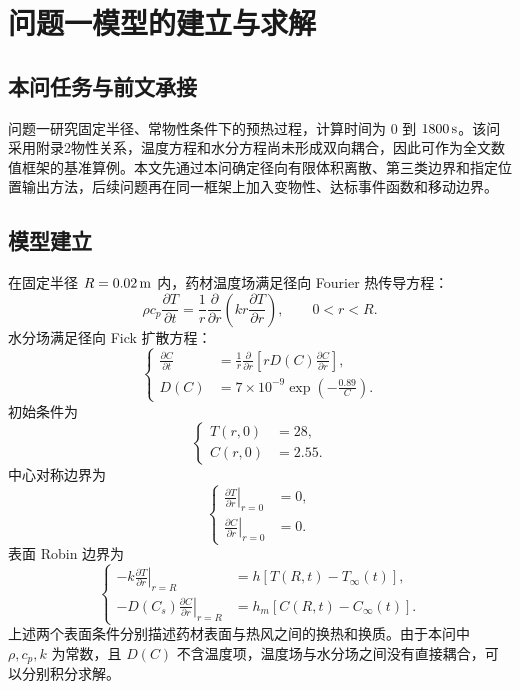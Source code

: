 \documentclass[UTF8,a4paper,12pt]{ctexart}
\begin{document}
\section{问题一模型的建立与求解}
\subsection{本问任务与前文承接}
问题一研究固定半径、常物性条件下的预热过程，计算时间为 $0$ 到 $1800\rm\,s$。该问采用附录2物性关系，温度方程和水分方程尚未形成双向耦合，因此可作为全文数值框架的基准算例。本文先通过本问确定径向有限体积离散、第三类边界和指定位置输出方法，后续问题再在同一框架上加入变物性、达标事件函数和移动边界。

\subsection{模型建立}
在固定半径 $R=0.02\rm\,m$ 内，药材温度场满足径向 Fourier 热传导方程：
\begin{equation}
  \rho c_p\frac{\partial T}{\partial t}
  =\frac1r\frac{\partial}{\partial r}
  \left(kr\frac{\partial T}{\partial r}\right),
  \qquad 0<r<R.
\end{equation}
水分场满足径向 Fick 扩散方程：
\begin{equation}
\left\{
\begin{aligned}
\frac{\partial C}{\partial t}
&=\frac{1}{r}\frac{\partial}{\partial r}
\left[rD(C)\frac{\partial C}{\partial r}\right],\\
D(C)&=7\times10^{-9}\exp\left(-\frac{0.89}{C}\right).
\end{aligned}
\right.
\end{equation}
初始条件为
\begin{equation}
\left\{
\begin{aligned}
T(r,0)&=28,\\
C(r,0)&=2.55.
\end{aligned}
\right.
\end{equation}
中心对称边界为
\begin{equation}
\left\{
\begin{aligned}
\left.\frac{\partial T}{\partial r}\right|_{r=0}&=0,\\
\left.\frac{\partial C}{\partial r}\right|_{r=0}&=0.
\end{aligned}
\right.
\end{equation}
表面 Robin 边界为
\begin{equation}
\left\{
\begin{aligned}
  -k\left.\frac{\partial T}{\partial r}\right|_{r=R}
  &=h\left[T(R,t)-T_\infty(t)\right],\\
  -D(C_s)\left.\frac{\partial C}{\partial r}\right|_{r=R}
  &=h_m\left[C(R,t)-C_\infty(t)\right].
\end{aligned}
\right.
\end{equation}
上述两个表面条件分别描述药材表面与热风之间的换热和换质。由于本问中 $\rho,c_p,k$ 为常数，且 $D(C)$ 不含温度项，温度场与水分场之间没有直接耦合，可以分别积分求解。
\end{document}
